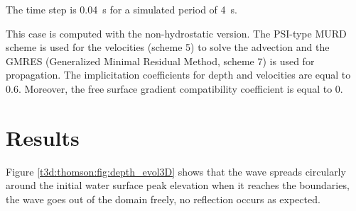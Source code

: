 \bigskip
The time step is 0.04~s for a simulated period of 4~s. 

\bigskip
This case is computed with the non-hydrostatic version. The PSI-type MURD scheme 
is used for the velocities (scheme 5) to solve the advection and the GMRES 
(Generalized Minimal Residual Method, scheme 7) is used for propagation. 
The implicitation coefficients for depth and velocities are equal to 0.6.
Moreover, the free surface gradient compatibility coefficient is equal to 0.

\section{Results}
%
\bigskip
Figure \ref{t3d:thomson:fig:depth_evol3D}
shows that the wave spreads circularly around the initial water 
surface peak elevation when it reaches the boundaries,
the wave goes out of the domain freely, no reflection occurs as expected.

%

